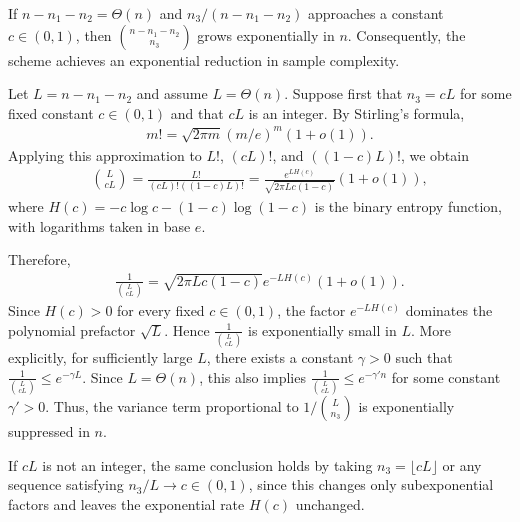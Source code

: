 \documentclass[prl,aps,notitlepage,superscriptaddress,showpacs,nofootinbib]{revtex4-2}
\begin{document}
{If $n-n_1-n_2=\Theta(n)$ and $n_3/(n-n_1-n_2)$ approaches a constant $c\in(0,1)$, then $\binom{n-n_1-n_2}{n_3}$ grows exponentially in $n$. Consequently, the scheme achieves an exponential reduction in sample complexity.

Let $L=n-n_1-n_2$ and assume $L=\Theta(n)$. Suppose first that $n_3=cL$ for some fixed constant $c\in(0,1)$ and that $cL$ is an integer. By Stirling's formula, 
\begin{align}
    m! =\sqrt{2\pi m}(m/e)^m(1+o(1)).
\end{align}
Applying this approximation to $L!$, $(cL)!$, and $((1-c)L)!$, we obtain
\begin{align}
    \binom{L}{cL}=\frac{L!}{(cL)!((1-c)L)!}
=\frac{e^{L H(c)}}{\sqrt{2\pi Lc(1-c)}}(1+o(1)),
\end{align}
where $H(c)=-c\log c-(1-c)\log(1-c)$ is the binary entropy function, with logarithms taken in base $e$.

Therefore,
\begin{align}
    \frac{1}{\binom{L}{cL}}
=\sqrt{2\pi Lc(1-c)}e^{-L H(c)}(1+o(1)).
\end{align}
Since $H(c)>0$ for every fixed $c\in(0,1)$,
 the factor $e^{-L H(c)}$ dominates the polynomial prefactor $\sqrt{L}$. Hence $\frac{1}{\binom{L}{cL}}$ is exponentially small in $L$. More explicitly, for sufficiently large $L$, there exists a constant $\gamma>0$ such that $\frac{1}{\binom{L}{cL}}\le e^{-\gamma L}$. Since $L=\Theta(n)$, this also implies $\frac{1}{\binom{L}{cL}}\le e^{-\gamma' n}$ for some constant $\gamma'>0$. Thus, the variance term proportional to $1/\binom{L}{n_3}$ is exponentially suppressed in $n$.

If $cL$ is not an integer, the same conclusion holds by taking $n_3=\lfloor cL\rfloor$ or any sequence satisfying $n_3/L\to c\in(0,1)$, since this changes only subexponential factors and leaves the exponential rate $H(c)$ unchanged.

}
\end{document}
